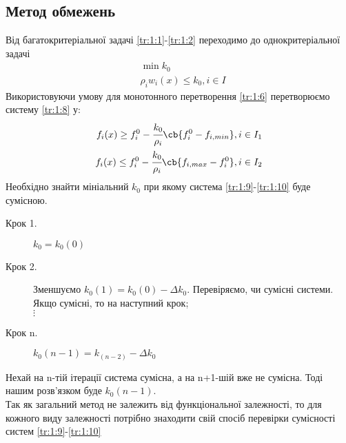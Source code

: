 \subsection{Метод обмежень}
Від багатокритеріальної задачі \eqref{tr:1:1}-\eqref{tr:1:2} переходимо до однокритеріальної задачі
\begin{eqnarray}
&\min k_0 \\
&\rho_i w_i(x)\leq k_0,i\in I \label{tr:1:8}
\end{eqnarray}
Використовуючи умову для монотонного перетворення \eqref{tr:1:6} перетворюємо систему \eqref{tr:1:8} у:
\begin{eqnarray}
f_i(x) \geq f_i^0 - \cfrac{k_0}{\rho_i}\cb{f_i^0 - f_{i,min}},i\in I_1\label{tr:1:9}\\
f_i(x) \leq f_i^0 - \cfrac{k_0}{\rho_i}\cb{f_{i,max}-f_i^0},i\in I_2\label{tr:1:10}
\end{eqnarray}
Необхідно знайти мініальний $k_0$ при якому система \eqref{tr:1:9}-\eqref{tr:1:10} буде сумісною.
\begin{description}
\item[Крок 1.] $k_0=k_0(0)$
\item[Крок 2.] Зменшуємо $k_0(1)=k_0(0)-\Delta k_0$. Перевіряємо, чи сумісні системи. Якщо сумісні, то на наступний крок;\\
$\vdots$
\item[Крок n.] $k_0(n-1)=k_(n-2)-\Delta k_0$
\end{description}
Нехай на n-тій ітерації система сумісна, а на n+1-шій вже не сумісна. Тоді нашим розв’язком буде $k_0(n-1)$. \\
Так як загальний метод не залежить від функціональної залежності, то для кожного виду залежності потрібно знаходити свій спосіб перевірки сумісності систем \eqref{tr:1:9}-\eqref{tr:1:10}
